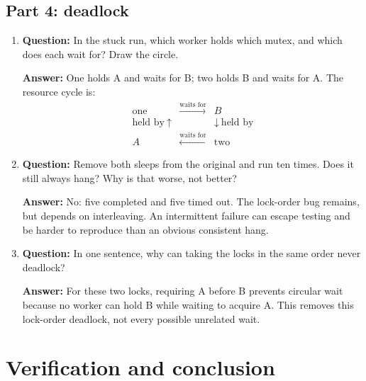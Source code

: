 \documentclass[12pt]{article}
\begin{document}
\subsection{Part 4: deadlock}
\begin{enumerate}
\item \textbf{Question:} In the stuck run, which worker holds which mutex, and which does each wait for? Draw the circle.
\par\textbf{Answer:} One holds A and waits for B; two holds B and waits
for A. The resource cycle is:
\[
\begin{array}{ccc}
\text{one} & \xrightarrow{\text{waits for}} & B \\
\scriptstyle\text{held by}\ \uparrow & & \downarrow\ \scriptstyle\text{held by} \\
A & \xleftarrow{\text{waits for}} & \text{two}
\end{array}
\]

\item \textbf{Question:} Remove both sleeps from the original and run ten times. Does it still always hang? Why is that worse, not better?
\par\textbf{Answer:} No: five completed and five timed out. The lock-order
bug remains, but depends on interleaving. An intermittent failure can
escape testing and be harder to reproduce than an obvious consistent hang.

\item \textbf{Question:} In one sentence, why can taking the locks in the same order never deadlock?
\par\textbf{Answer:} For these two locks, requiring A before B prevents
circular wait because no worker can hold B while waiting to acquire A.
This removes this lock-order deadlock, not every possible unrelated wait.
\end{enumerate}

\clearpage
\section{Verification and conclusion}
\end{document}
